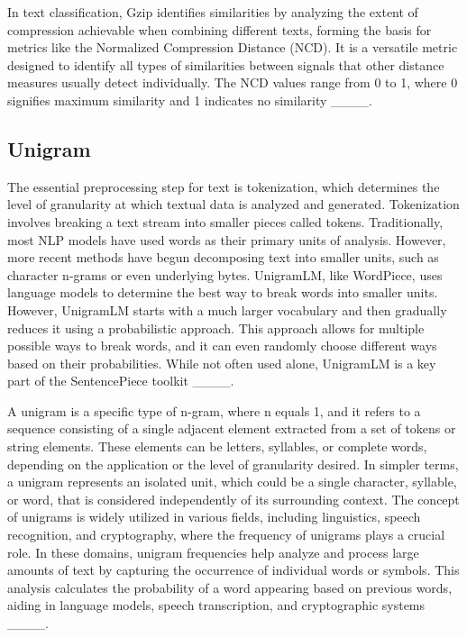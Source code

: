 In text classification, Gzip identifies similarities by analyzing the extent of compression achievable when combining different texts, forming the basis for metrics like the Normalized Compression Distance (NCD). It is a versatile metric designed to identify all types of similarities between signals that other distance measures usually detect individually. The NCD values range from 0 to 1, where 0 signifies maximum similarity and 1 indicates no similarity ____.

\subsection{Unigram}

The essential preprocessing step for text is tokenization, which determines the level of granularity at which textual data is analyzed and generated. Tokenization involves breaking a text stream into smaller pieces called tokens. Traditionally, most NLP models have used words as their primary units of analysis. However, more recent methods have begun decomposing text into smaller units, such as character n-grams or even underlying bytes. UnigramLM, like WordPiece, uses language models to determine the best way to break words into smaller units. However, UnigramLM starts with a much larger vocabulary and then gradually reduces it using a probabilistic approach. This approach allows for multiple possible ways to break words, and it can even randomly choose different ways based on their probabilities. While not often used alone, UnigramLM is a key part of the SentencePiece toolkit ____. 

A unigram is a specific type of n-gram, where n equals 1, and it refers to a sequence consisting of a single adjacent element extracted from a set of tokens or string elements. These elements can be letters, syllables, or complete words, depending on the application or the level of granularity desired. In simpler terms, a unigram represents an isolated unit, which could be a single character, syllable, or word, that is considered independently of its surrounding context. The concept of unigrams is widely utilized in various fields, including linguistics, speech recognition, and cryptography, where the frequency of unigrams plays a crucial role. In these domains, unigram frequencies help analyze and process large amounts of text by capturing the occurrence of individual words or symbols. This analysis calculates the probability of a word appearing based on previous words, aiding in language models, speech transcription, and cryptographic systems ____.